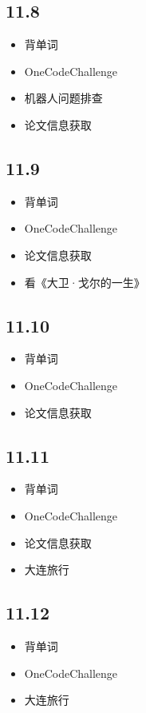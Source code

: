 \documentclass[UTF8]{ctexart}
\begin{document}
\subsection*{11.8}
\begin{itemize}
    \item 背单词
    \item OneCodeChallenge
    \item 机器人问题排查
    \item 论文信息获取
\end{itemize}

\subsection*{11.9}
\begin{itemize}
    \item 背单词
    \item OneCodeChallenge
    \item 论文信息获取
    \item 看《大卫·戈尔的一生》
\end{itemize}

\subsection*{11.10}
\begin{itemize}
    \item 背单词
    \item OneCodeChallenge
    \item 论文信息获取
\end{itemize}

\subsection*{11.11}
\begin{itemize}
    \item 背单词
    \item OneCodeChallenge
    \item 论文信息获取
    \item 大连旅行
\end{itemize}

\subsection*{11.12}
\begin{itemize}
    \item 背单词
    \item OneCodeChallenge
    \item 大连旅行
\end{itemize}
\end{document}
